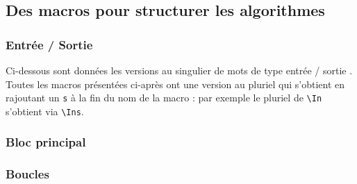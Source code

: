 \documentclass[12pt,a4paper]{article}
\theoremstyle{definition}
\newcommand\env[1]{\texttt{#1}}
\newcommand\macro[1]{\env{\textbackslash{}#1}}
\newcommand\prefix[1]{%
    \texttt{#1}%
}
\begin{document}
\subsection{Des macros pour structurer les algorithmes}

\subsubsection{Entrée / Sortie}

Ci-dessous sont données les versions au singulier de mots de type \og entrée / sortie \fg{}.
Toutes les macros présentées ci-après ont une version au pluriel qui s'obtient en rajoutant un \prefix{s} à la fin du nom de la macro : par exemple le pluriel de \macro{In} s'obtient via \macro{Ins}.






\subsubsection{Bloc principal}



\subsubsection{Boucles \txtWhile*}
\end{document}
